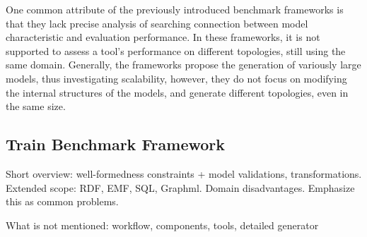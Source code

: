 One common attribute of the previously introduced benchmark frameworks is that they lack precise analysis of searching connection between model characteristic and evaluation performance. In these frameworks, it is not supported to assess a tool's performance on different topologies, still using the same domain. Generally, the frameworks propose the generation of variously large models, thus investigating scalability, however, they do not focus on modifying the internal structures of the models, and generate different topologies, even in the same size.
 


\subsection{Train Benchmark Framework}
Short overview: well-formedness constraints + model validations, transformations.\\
Extended scope: RDF, EMF, SQL, Graphml.
Domain disadvantages. Emphasize this as common problems.

What is not mentioned: workflow, components, tools, detailed generator